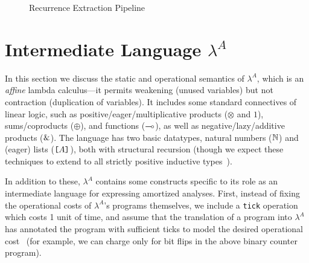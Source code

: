

\begin{figure}[t]
  
  \caption{Recurrence Extraction Pipeline}
  \label{fig:pipeline}
\end{figure}


\section{Intermediate Language \texorpdfstring{$\lambda^A$}{}}\label{sec:la}

In this section we discuss the static and operational semantics of
$\lambda^A$, which is an \emph{affine} lambda calculus---it permits
weakening (unused variables) but not contraction (duplication of
variables).  It includes some standard connectives of linear logic, such
as positive/eager/multiplicative products ($\otimes$ and $1$),
sums/coproducts ($\oplus$), and functions ($\multimap$), as well as
negative/lazy/additive products ($\&$).  The language has two basic
datatypes, natural numbers ($\mathbb{N}$) and (eager) lists ($\texttt{[}A\texttt{]}$), both
with structural recursion (though we expect these techniques to extend
to all strictly positive inductive
types~\cite{danner-et-al:icfp15,danner-licata:jfp-in-prep}).

In addition to these, $\lambda^A$ contains some constructs specific to
its role as an intermediate language for expressing amortized analyses.
First, instead of fixing the operational costs of $\lambda^A$'s programs
themselves, we include a \texttt{tick} operation which costs 1 unit of
time, and assume that the translation of a program into $\lambda^A$ has
annotated the program with sufficient ticks to model the desired
operational cost~\cite{danielsson:popl08} (for example, we can
charge only for bit flips in the above binary counter
program).

